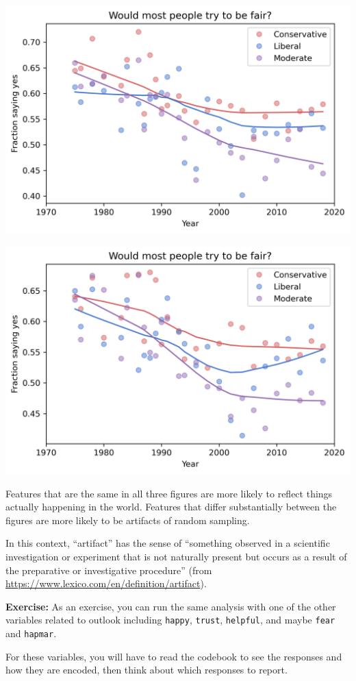 \begin{center}
\includegraphics[scale=0.75]{03_outlook_files/03_outlook_60_1.png}
\end{center}

\begin{center}
\includegraphics[scale=0.75]{03_outlook_files/03_outlook_60_2.png}
\end{center}

Features that are the same in all three figures are more likely to
reflect things actually happening in the world. Features that differ
substantially between the figures are more likely to be artifacts of
random sampling.

In this context, ``artifact'' has the sense of ``something observed in a
scientific investigation or experiment that is not naturally present but
occurs as a result of the preparative or investigative procedure'' (from
\url{https://www.lexico.com/en/definition/artifact}).

\textbf{Exercise:} As an exercise, you can run the same analysis with
one of the other variables related to outlook including
\passthrough{\lstinline!happy!}, \passthrough{\lstinline!trust!},
\passthrough{\lstinline!helpful!}, and maybe
\passthrough{\lstinline!fear!} and \passthrough{\lstinline!hapmar!}.

For these variables, you will have to read the codebook to see the
responses and how they are encoded, then think about which responses to
report.

